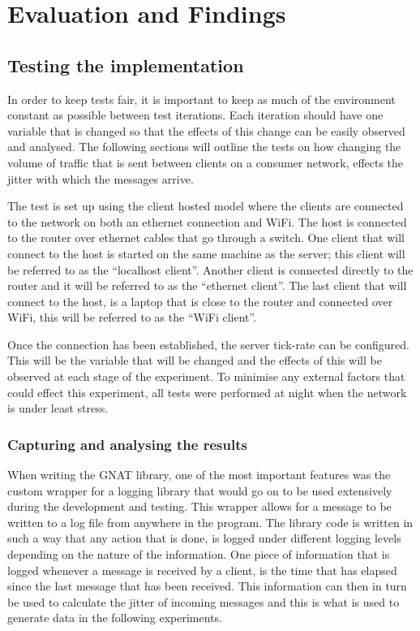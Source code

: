 \chapter{Evaluation and Findings}

\section{Testing the implementation} \label{sec:testing}
In order to keep tests fair, it is important to keep as much of the environment constant as possible between test iterations. Each iteration should have one variable that is changed so that the effects of this change can be easily observed and analysed. The following sections will outline the tests on how changing the volume of traffic that is sent between clients on a consumer network, effects the jitter with which the messages arrive.

The test is set up using the client hosted model where the clients are connected to the network on both an ethernet connection and WiFi. The host is connected to the router over ethernet cables that go through a switch. One client that will connect to the host is started on the same machine as the server; this client will be referred to as the ``localhost client''. Another client is connected directly to the router and it will be referred to as the ``ethernet client''. The last client that will connect to the host, is a laptop that is close to the router and connected over WiFi, this will be referred to as the ``WiFi client''.

Once the connection has been established, the server tick-rate can be configured. This will be the variable that will be changed and the effects of this will be observed at each stage of the experiment. To minimise any external factors that could effect this experiment, all tests were performed at night when the network is under least stress.

\subsection{Capturing and analysing the results}
When writing the GNAT library, one of the most important features was the custom wrapper for a logging library that would go on to be used extensively during the development and testing. This wrapper allows for a message to be written to a log file from anywhere in the program. The library code is written in such a way that any action that is done, is logged under different logging levels depending on the nature of the information. One piece of information that is logged whenever a message is received by a client, is the time that has elapsed since the last message that has been received. This information can then in turn be used to calculate the jitter of incoming messages and this is what is used to generate data in the following experiments.


